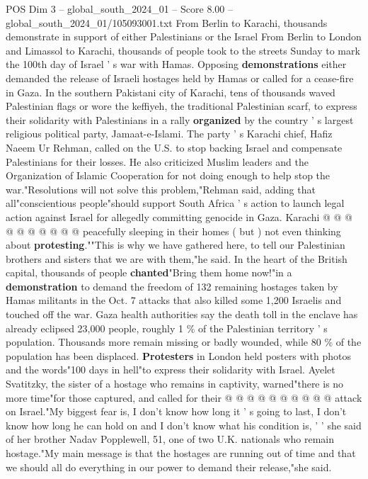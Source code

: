 \begin{textsample}{POS Dim 3 – global\_south\_2024\_01 – Score 8.00 – global\_south\_2024\_01/105093001.txt}  \label{ex:f3_pos_349}
From Berlin to Karachi, thousands demonstrate in support of either Palestinians or the Israel From Berlin to London and Limassol to Karachi, thousands of people took to the streets Sunday to mark the 100th day of Israel ' s war with Hamas.
Opposing \textbf{demonstrations} either demanded the release of Israeli hostages held by Hamas or called for a cease-fire in Gaza.
In the southern Pakistani city of Karachi, tens of thousands waved Palestinian flags or wore the keffiyeh, the traditional Palestinian scarf, to express their solidarity with Palestinians in a rally \textbf{organized} by the country ' s largest religious political party, Jamaat-e-Islami.
The party ' s Karachi chief, Hafiz Naeem Ur Rehman, called on the U.S. to stop backing Israel and compensate Palestinians for their losses.
He also criticized Muslim leaders and the Organization of Islamic Cooperation for not doing enough to help stop the war."Resolutions will not solve this problem,"Rehman said, adding that all"conscientious people"should support South Africa ' s action to launch legal action against Israel for allegedly committing genocide in Gaza.
Karachi @ @ @ @ @ @ @ @ @ @ peacefully sleeping in their homes ( but ) not even thinking about \textbf{protesting}.""This is why we have gathered here, to tell our Palestinian brothers and sisters that we are with them,"he said.
In the heart of the British capital, thousands of people \textbf{chanted}"Bring them home now!"in a \textbf{demonstration} to demand the freedom of 132 remaining hostages taken by Hamas militants in the Oct. 7 attacks that also killed some 1,200 Israelis and touched off the war.
Gaza health authorities say the death toll in the enclave has already eclipsed 23,000 people, roughly 1 \% of the Palestinian territory ' s population.
Thousands more remain missing or badly wounded, while 80 \% of the population has been displaced. \textbf{Protesters} in London held posters with photos and the words"100 days in hell"to express their solidarity with Israel.
Ayelet Svatitzky, the sister of a hostage who remains in captivity, warned"there is no more time"for those captured, and called for their @ @ @ @ @ @ @ @ @ @ attack on Israel."My biggest fear is, I don't know how long it ' s going to last, I don't know how long he can hold on and I don't know what his condition is, ' ' she said of her brother Nadav Popplewell, 51, one of two U.K. nationals who remain hostage."My main message is that the hostages are running out of time and that we should all do everything in our power to demand their release,"she said.

\end{textsample}
